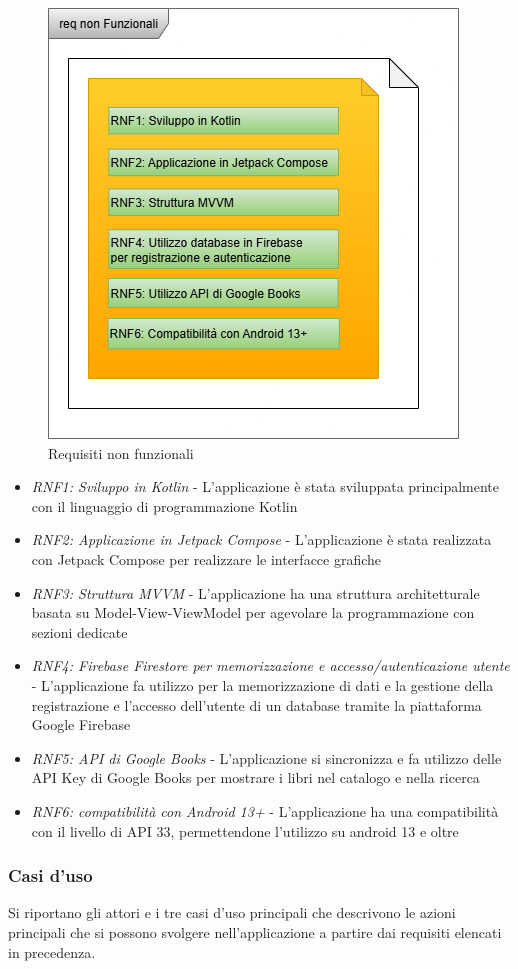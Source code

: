 \documentclass{article}
\begin{document}
\begin{figure}[H]
  \centering
  \includegraphics[width=.6\linewidth]{req_non_funzionali.png}
  \caption{Requisiti non funzionali}
  \label{fig:sitemap}
\end{figure}

\begin{itemize}[label=\textendash]
    \item \textit{RNF1: Sviluppo in Kotlin} - L'applicazione è stata sviluppata principalmente con il linguaggio di programmazione Kotlin
    \item \textit{RNF2: Applicazione in Jetpack Compose} - L'applicazione è stata realizzata con Jetpack Compose per realizzare le interfacce grafiche
    \item \textit{RNF3: Struttura MVVM} - L'applicazione ha una struttura architetturale basata su Model-View-ViewModel per agevolare la programmazione con sezioni dedicate
    \item \textit{RNF4: Firebase Firestore per memorizzazione e accesso/autenticazione utente} - L'applicazione fa utilizzo per la memorizzazione di dati e la gestione della registrazione e l'accesso dell'utente di un database tramite la piattaforma Google Firebase
    \item \textit{RNF5: API di Google Books} - L'applicazione si sincronizza e fa utilizzo delle API Key di Google Books per mostrare i libri nel catalogo e nella ricerca
    \item \textit{RNF6: compatibilità con Android 13+} - L'applicazione ha una compatibilità con il livello di API 33, permettendone l'utilizzo su android 13 e oltre
\end{itemize}

\subsubsection{Casi d'uso}
Si riportano gli attori e i tre casi d'uso principali che descrivono le azioni principali che si possono svolgere nell'applicazione a partire dai requisiti elencati in precedenza.
\end{document}

